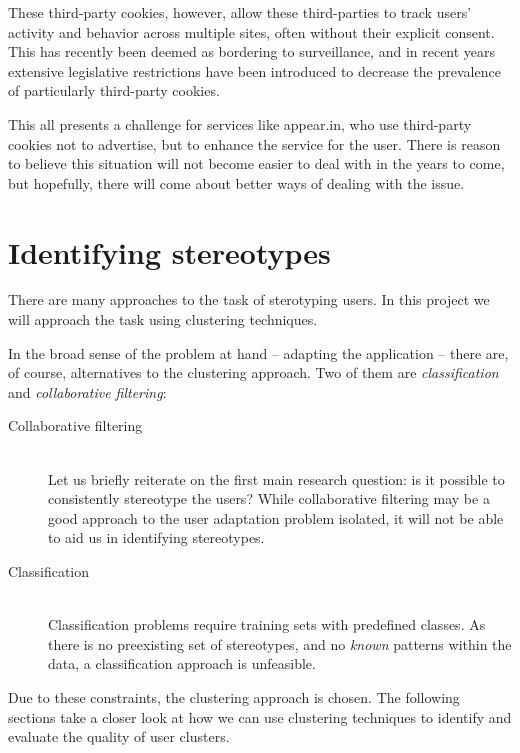       These third-party cookies, however, allow these third-parties to track users' activity and behavior across multiple sites, often without their explicit consent. This has recently been deemed as bordering to surveillance, and in recent years extensive legislative restrictions have been introduced to decrease the prevalence of particularly third-party cookies.

      This all presents a challenge for services like appear.in, who use third-party cookies not to advertise, but to enhance the service for the user. There is reason to believe this situation will not become easier to deal with in the years to come, but hopefully, there will come about better ways of dealing with the issue.

\section{Identifying stereotypes}
\label{survey:identifying_sterotypes}

  There are many approaches to the task of sterotyping users. In this project we will approach the task using clustering techniques.

  In the broad sense of the problem at hand -- adapting the application -- there are, of course, alternatives to the clustering approach. Two of them are \emph{classification} and \emph{collaborative filtering}:

  \begin{description}
    \item[Collaborative filtering] \hfill \\
      Let us briefly reiterate on the first main research question: is it possible to consistently stereotype the users? While collaborative filtering may be a good approach to the user adaptation problem isolated, it will not be able to aid us in identifying stereotypes.
    \item[Classification] \hfill \\
      Classification problems require training sets with predefined classes. As there is no preexisting set of stereotypes, and no \emph{known} patterns within the data, a classification approach is unfeasible.
  \end{description}

  Due to these constraints, the clustering approach is chosen. The following sections take a closer look at how we can use clustering techniques to identify and evaluate the quality of user clusters.

